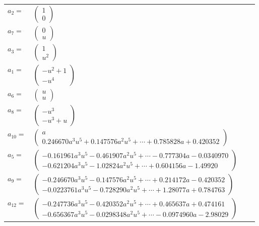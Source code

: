 \documentclass[1p]{elsarticle_modified}
\theoremstyle{definition}
\begin{document}
\begin{tabular}{m{7pt} m{180pt} m{7pt} m{180pt} }
\flushright $a_{2}=$&$\begin{pmatrix}1\\0\end{pmatrix}$ \\
\flushright $a_{7}=$&$\begin{pmatrix}0\\u\end{pmatrix}$ \\
\flushright $a_{3}=$&$\begin{pmatrix}1\\u^2\end{pmatrix}$ \\
\flushright $a_{1}=$&$\begin{pmatrix}- u^2+1\\- u^4\end{pmatrix}$ \\
\flushright $a_{6}=$&$\begin{pmatrix}u\\u\end{pmatrix}$ \\
\flushright $a_{8}=$&$\begin{pmatrix}- u^3\\- u^3+u\end{pmatrix}$ \\
\flushright $a_{10}=$&$\begin{pmatrix}a\\0.246670 a^{3} u^{5}+0.147576 a^{2} u^{5}+\cdots+0.785828 a+0.420352\end{pmatrix}$ \\
\flushright $a_{5}=$&$\begin{pmatrix}-0.161961 a^{3} u^{5}-0.461907 a^{2} u^{5}+\cdots-0.777304 a-0.0340970\\-0.621204 a^{3} u^{5}-1.02824 a^{2} u^{5}+\cdots+0.604156 a-1.49920\end{pmatrix}$ \\
\flushright $a_{9}=$&$\begin{pmatrix}-0.246670 a^{3} u^{5}-0.147576 a^{2} u^{5}+\cdots+0.214172 a-0.420352\\-0.0223761 a^{3} u^{5}-0.728290 a^{2} u^{5}+\cdots+1.28077 a+0.784763\end{pmatrix}$ \\
\flushright $a_{12}=$&$\begin{pmatrix}-0.247736 a^{3} u^{5}-0.420352 a^{2} u^{5}+\cdots+0.465637 a+0.474161\\-0.656367 a^{3} u^{5}-0.0298348 a^{2} u^{5}+\cdots-0.0974960 a-2.98029\end{pmatrix}$ \\

\end{tabular}
\end{document}
